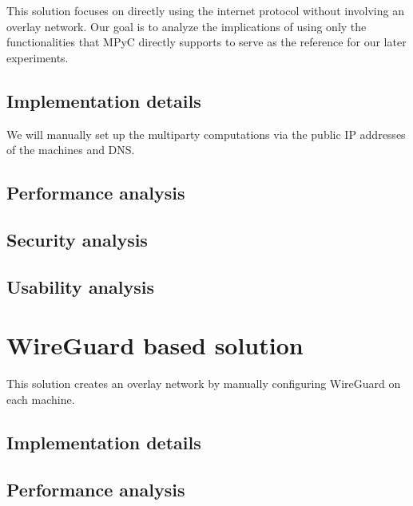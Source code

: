 This solution focuses on directly using the internet protocol without
involving an overlay network. Our goal is to analyze the implications of
using only the functionalities that MPyC directly supports to serve as
the reference for our later experiments.

\hypertarget{implementation-details}{%
\section{Implementation details}\label{implementation-details}}

We will manually set up the multiparty computations via the public IP
addresses of the machines and DNS.

\hypertarget{performance-analysis}{%
\section{Performance analysis}\label{performance-analysis}}

\hypertarget{security-analysis}{%
\section{Security analysis}\label{security-analysis}}

\hypertarget{usability-analysis}{%
\section{Usability analysis}\label{usability-analysis}}

\hypertarget{wireguard-based-solution}{%
\chapter{WireGuard based solution}\label{wireguard-based-solution}}

This solution creates an overlay network by manually configuring
WireGuard on each machine.

\hypertarget{implementation-details}{%
\section{Implementation details}\label{implementation-details}}

\hypertarget{performance-analysis}{%
\section{Performance analysis}\label{performance-analysis}}

